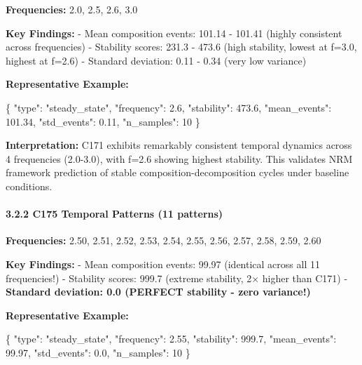\documentclass[
]{article}
\newenvironment{Shaded}{}{}
\newcommand{\DataTypeTok}[1]{\textcolor[rgb]{0.56,0.13,0.00}{#1}}
\newcommand{\DecValTok}[1]{\textcolor[rgb]{0.25,0.63,0.44}{#1}}
\newcommand{\FloatTok}[1]{\textcolor[rgb]{0.25,0.63,0.44}{#1}}
\newcommand{\FunctionTok}[1]{\textcolor[rgb]{0.02,0.16,0.49}{#1}}
\newcommand{\StringTok}[1]{\textcolor[rgb]{0.25,0.44,0.63}{#1}}
\begin{document}
\textbf{Frequencies:} 2.0, 2.5, 2.6, 3.0

\textbf{Key Findings:} - Mean composition events: 101.14 - 101.41
(highly consistent across frequencies) - Stability scores: 231.3 - 473.6
(high stability, lowest at f=3.0, highest at f=2.6) - Standard
deviation: 0.11 - 0.34 (very low variance)

\textbf{Representative Example:}

\begin{Shaded}
\begin{Highlighting}[]
\FunctionTok{\{}
  \DataTypeTok{"type"}\FunctionTok{:} \StringTok{"steady\_state"}\FunctionTok{,}
  \DataTypeTok{"frequency"}\FunctionTok{:} \FloatTok{2.6}\FunctionTok{,}
  \DataTypeTok{"stability"}\FunctionTok{:} \FloatTok{473.6}\FunctionTok{,}
  \DataTypeTok{"mean\_events"}\FunctionTok{:} \FloatTok{101.34}\FunctionTok{,}
  \DataTypeTok{"std\_events"}\FunctionTok{:} \FloatTok{0.11}\FunctionTok{,}
  \DataTypeTok{"n\_samples"}\FunctionTok{:} \DecValTok{10}
\FunctionTok{\}}
\end{Highlighting}
\end{Shaded}

\textbf{Interpretation:} C171 exhibits remarkably consistent temporal
dynamics across 4 frequencies (2.0-3.0), with f=2.6 showing highest
stability. This validates NRM framework prediction of stable
composition-decomposition cycles under baseline conditions.

\paragraph{3.2.2 C175 Temporal Patterns (11
patterns)}\label{c175-temporal-patterns-11-patterns}

\textbf{Frequencies:} 2.50, 2.51, 2.52, 2.53, 2.54, 2.55, 2.56, 2.57,
2.58, 2.59, 2.60

\textbf{Key Findings:} - Mean composition events: 99.97 (identical
across all 11 frequencies!) - Stability scores: 999.7 (extreme
stability, 2× higher than C171) - \textbf{Standard deviation: 0.0
(PERFECT stability - zero variance!)}

\textbf{Representative Example:}

\begin{Shaded}
\begin{Highlighting}[]
\FunctionTok{\{}
  \DataTypeTok{"type"}\FunctionTok{:} \StringTok{"steady\_state"}\FunctionTok{,}
  \DataTypeTok{"frequency"}\FunctionTok{:} \FloatTok{2.55}\FunctionTok{,}
  \DataTypeTok{"stability"}\FunctionTok{:} \FloatTok{999.7}\FunctionTok{,}
  \DataTypeTok{"mean\_events"}\FunctionTok{:} \FloatTok{99.97}\FunctionTok{,}
  \DataTypeTok{"std\_events"}\FunctionTok{:} \FloatTok{0.0}\FunctionTok{,}
  \DataTypeTok{"n\_samples"}\FunctionTok{:} \DecValTok{10}
\FunctionTok{\}}
\end{Highlighting}
\end{Shaded}
\end{document}
